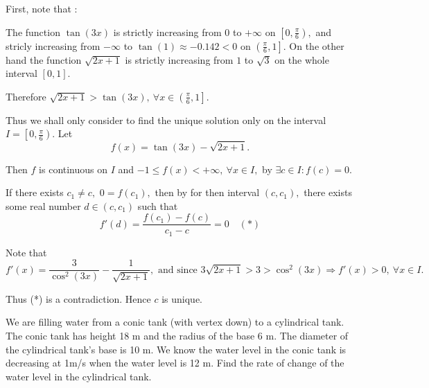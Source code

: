 \documentclass{article}
\begin{document}
\begin{soln}
    First, note that :
    \begin{itemize}[topsep=0pt, partopsep=0pt, itemsep=0pt]
        \ii The function $\tan(3x)$ is strictly increasing from $0$ to $+\infty$ on $\left[ 0, \frac{\pi}{6} \right),$
        and stricly increasing from $-\infty$ to $\tan(1) \approx -0.142 < 0$ on $\left( \frac{\pi}{6}, 1 \right].$
        \ii On the other hand the function $\sqrt{2x + 1}$ is strictly increasing from $1$ to $\sqrt{3}$ on the whole interval $[0,1].$
    \end{itemize}

    Therefore $\sqrt{2x + 1} > \tan(3x),\ \forall x \in \left( \frac{\pi}{6}, 1\right].$

    Thus we shall only consider to find the unique solution only on the interval $I = \left[ 0, \frac{\pi}{6} \right).$
    Let
    \[
        f(x) = \tan(3x) - \sqrt{2x + 1}.
    \]
    
    Then $f$ is continuous on $I$ and $-1 \le f(x) < +\infty,\ \forall x \in I,$
    by  $\exists c \in I: f(c) = 0.$

    If there exists $c_1 \ne c,$ $0 = f(c_1),$ then by  for then interval $(c, c_1),$
    there exists some real number $d \in (c,c_1)$ such that 
    \[
        f'(d) = \frac{f(c_1) - f(c)}{c_1 - c} = 0 \quad (*)
    \]
    
    Note that
    \[
        f'(x) = \dfrac{3}{\cos^2(3x)} - \dfrac{1}{\sqrt{2x + 1}}, \text{\ and since\ } 3\sqrt{2x + 1} > 3 > \cos^2(3x) \Rightarrow f'(x) > 0,\ \forall x\in I.
    \]

    Thus (*) is a contradiction. Hence $c$ is unique.
\end{soln}

\newpage

\begin{problem*}[4]
    We are filling water from a conic tank (with vertex down) to a cylindrical tank.
    The conic tank has height 18 m and the radius of the base 6 m. The diameter of the cylindrical tank’s base is 10 m.
    We know the water level in the conic tank is decreasing at 1m/s when the water level is 12 m.
    Find the rate of change of the water level in the cylindrical tank.
\end{problem*}
\end{document}
